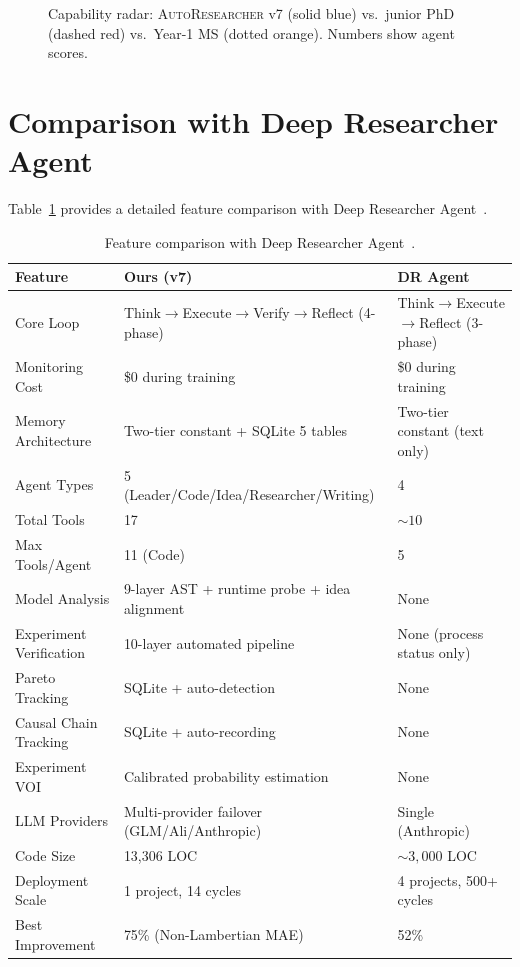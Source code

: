\documentclass[11pt,a4paper]{article}
\newcommand{\sysname}{\textsc{AutoResearcher}}
\begin{document}
\begin{figure}[t]
\caption{Capability radar: \sysname{} v7 (solid blue) vs.\ junior PhD (dashed red) vs.\ Year-1 MS (dotted orange). Numbers show agent scores.}
\label{fig:radar}
\end{figure}


\section{Comparison with Deep Researcher Agent}

Table~\ref{tab:comparison} provides a detailed feature comparison with Deep Researcher Agent~\cite{zhang2026deep}.

\begin{table}[t]
\centering
\begin{threeparttable}
\caption{Feature comparison with Deep Researcher Agent~\cite{zhang2026deep}.}
\label{tab:comparison}
\begin{tabularx}{\linewidth}{l X X}
\toprule
\textbf{Feature} & \textbf{Ours (v7)} & \textbf{DR Agent~\cite{zhang2026deep}} \\
\midrule
Core Loop & Think$\to$Execute$\to$Verify$\to$Reflect (4-phase) & Think$\to$Execute$\to$Reflect (3-phase) \\
Monitoring Cost & \$0 during training & \$0 during training \\
Memory Architecture & Two-tier constant + SQLite 5 tables & Two-tier constant (text only) \\
Agent Types & 5 (Leader/Code/Idea/Researcher/Writing) & 4 \\
Total Tools & 17 & ${\sim}10$ \\
Max Tools/Agent & 11 (Code) & 5 \\
Model Analysis & 9-layer AST + runtime probe + idea alignment & None \\
Experiment Verification & 10-layer automated pipeline & None (process status only) \\
Pareto Tracking & SQLite + auto-detection & None \\
Causal Chain Tracking & SQLite + auto-recording & None \\
Experiment VOI & Calibrated probability estimation & None \\
LLM Providers & Multi-provider failover (GLM/Ali/Anthropic) & Single (Anthropic) \\
Code Size & 13,306 LOC & ${\sim}3{,}000$ LOC \\
Deployment Scale & 1 project, 14 cycles & 4 projects, 500+ cycles \\
Best Improvement & 75\% (Non-Lambertian MAE) & 52\% \\
\bottomrule
\end{tabularx}
\end{threeparttable}
\end{table}
\end{document}
